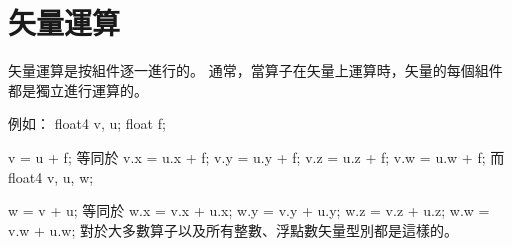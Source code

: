 \section{矢量運算}

矢量運算是按組件逐一進行的。
通常，當算子在矢量上運算時，矢量的每個組件都是獨立進行運算的。

例如：
\startclc[indentnext=no]
float4	v, u;
float	f;

v = u + f;
\stopclc
等同於
\startclc[indentnext=no]
v.x = u.x + f;
v.y = u.y + f;
v.z = u.z + f;
v.w = u.w + f;
\stopclc
而
\startclc[indentnext=no]
float4	v, u, w;

w = v + u;
\stopclc
等同於
\startclc[indentnext=no]
w.x = v.x + u.x;
w.y = v.y + u.y;
w.z = v.z + u.z;
w.w = v.w + u.w;
\stopclc
對於大多數算子以及所有整數、浮點數矢量型別都是這樣的。

